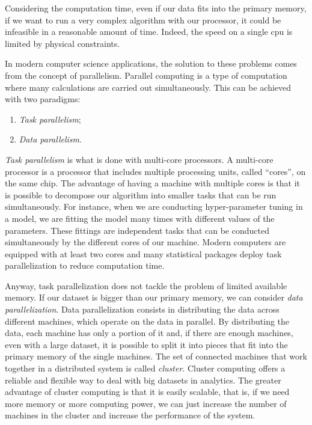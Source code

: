 \documentclass[a4paper, twoside, openright, 12pt]{report}
\providecommand{\tightlist}{%
  \setlength{\itemsep}{0pt}\setlength{\parskip}{0pt}}
\theoremstyle{definition}
\theoremstyle{definition}
\theoremstyle{definition}
\theoremstyle{remark}
\begin{document}
Considering the computation time, even if our data fits into the primary memory, if we want to run a very complex algorithm with our processor, it could be infeasible in a reasonable amount of time. Indeed, the speed on a single \ac{cpu} is limited by physical constraints.

In modern computer science applications, the solution to these problems comes from the concept of parallelism. Parallel computing is a type of computation where many calculations are carried out simultaneously. This can be achieved with two paradigms:

\begin{enumerate}
\def\labelenumi{\arabic{enumi}.}
\tightlist
\item
  \emph{Task parallelism};
\item
  \emph{Data parallelism}.
\end{enumerate}

\emph{Task parallelism} is what is done with multi-core processors. A multi-core processor is a processor that includes multiple processing units, called ``cores'', on the same chip. The advantage of having a machine with multiple cores is that it is possible to decompose our algorithm into smaller tasks that can be run simultaneously. For instance, when we are conducting hyper-parameter tuning in a model, we are fitting the model many times with different values of the parameters. These fittings are independent tasks that can be conducted simultaneously by the different cores of our machine. Modern computers are equipped with at least two cores and many statistical packages deploy task parallelization to reduce computation time.

Anyway, task parallelization does not tackle the problem of limited available memory. If our dataset is bigger than our primary memory, we can consider \emph{data parallelization}. Data parallelization consists in distributing the data across different machines, which operate on the data in parallel. By distributing the data, each machine has only a portion of it and, if there are enough machines, even with a large dataset, it is possible to split it into pieces that fit into the primary memory of the single machines. The set of connected machines that work together in a distributed system is called \emph{cluster}. Cluster computing offers a reliable and flexible way to deal with big datasets in analytics. The greater advantage of cluster computing is that it is easily scalable, that is, if we need more memory or more computing power, we can just increase the number of machines in the cluster and increase the performance of the system.
\end{document}
